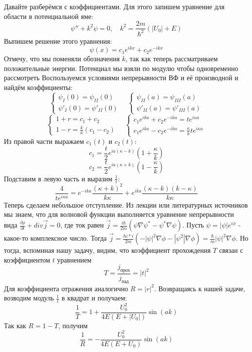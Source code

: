 Давайте разберёмся с коэффициентами. Для этого запишем уравнение для области в потенциальной яме:
\[
\psi'' + k^2\psi = 0, \quad k^2 = \frac{2m}{\hbar^2}(|U_0| + E)
\]
Выпишем решение этого уравнения:
\[
\psi(x) = c_1e^{ikx} + c_2e^{-ikx}
\]
Отмечу, что мы поменяли обозначения $k$, так как теперь рассматриваем положительные энергии. Потенциал мы взяли по модулю чтобы одновременно рассмотреть  Воспользуемся условиями непрерывности ВФ и её производной и найдём коэффициенты:
\[
\begin{cases}
    \psi_I(0) = \psi_{II}(0) \\
    \psi'_I(0) = \psi'_{II}(0) 
\end{cases}
\quad
\begin{cases}
    \psi_{II}(a) = \psi_{III}(a) \\
    \psi'_{II}(a) = \psi'_{III}(a) 
\end{cases}
\]
\[
\begin{cases}
    1 + r = c_1 + c_2 \\
    1-r = \frac{k}{\kappa}(c_1 - c_2) 
\end{cases}
\quad
\begin{cases}
    c_1e^{ika} + c_2e^{-ika} = te^{i\kappa a}\\
    c_1e^{ika} - c_2e^{-ika} = \frac{\kappa}{k}te^{i\kappa a}
\end{cases}
\]
Из правой части выражаем $c_1(t)$ и $c_2(t)$:
\[
c_1 = \frac{t}{2}e^{ia(\kappa - k)}(1 + \frac{\kappa}{k})
\]
\[
c_2 = \frac{t}{2}e^{ia(\kappa + k)}(1 - \frac{\kappa}{k})
\]
Подставим в левую часть и выразим $\frac{1}{t}$:
\[
\frac{4}{te^{i\kappa a}} = e^{-ika}\frac{(\kappa + k)^2}{k\kappa} + e^{ika}\frac{(\kappa - k)(k - \kappa)}{k\kappa}
\]
Теперь сделаем небольшое отступление. Из лекции или литературных источников мы знаем, что для волновой функции выполняется уравнение непрерывности вида $\frac{\partial \rho}{\partial t} + div \vec{j} = 0$, где ток равен $\vec{j} = \frac{i\hbar}{2m}(\psi\nabla\psi^* - \psi^*\nabla\psi)$. Пусть $\psi = |\psi|e^{i\phi}$ - какое-то комплексное число. Тогда $\vec{j} = \frac{\hbar i*i}{2m}(-|\psi|^2\nabla\phi - |\psi^2|\nabla\phi) = \frac{\hbar}{m}|\psi|^2\nabla\phi$. Но тогда, вспоминая нашу задачу, видим, что коэффициент прохождения $T$ связан с коэффициентом $t$ уравнением 
\[
T = \frac{j_{\text{прох}}}{j_{\text{пад}}} = |t|^2
\]
Для коэффициента отражения аналогично $R = |r|^2$. Возвращаясь к нашей задаче, возводим модуль $\frac{1}{t}$ в квадрат и получаем:
\[
\frac{1}{T} = 1 + \frac{U_0^2}{4E(E+|U_0|)} \sin(ak)
\]
Так как $R = 1 - T$, получим 
\[
\frac{1}{R} = -\frac{U_0^2}{4E(E+U_0)} \sin(ak)
\]
